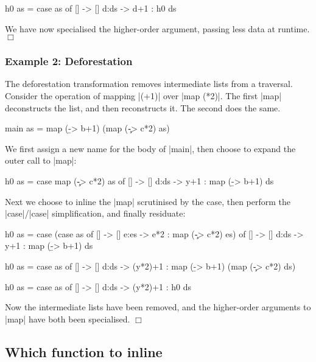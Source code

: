 \documentclass{llncs}
\newcommand{\noexample}{\hfill$\Box$}
\begin{document}
\begin{code}
h0 as = case  as of
              []    -> []
              d:ds  -> d+1 : h0 ds
\end{code}

We have now specialised the higher-order argument, passing less data at runtime.\noexample

\subsubsection{Example 2: Deforestation}\hfill

The deforestation transformation \cite{wadler:deforestation} removes intermediate lists from a traversal. Consider the operation of mapping |(+1)| over |map (*2)|. The first |map| deconstructs the list, and then reconstructs it. The second does the same.

\begin{code}
main as = map (\b -> b+1) (map (\c -> c*2) as)
\end{code}

We first assign a new name for the body of |main|, then choose to expand the outer call to |map|:

\begin{code}
h0 as = case  map (\c -> c*2) as of
              []    -> []
              d:ds  -> y+1 : map (\b -> b+1) ds
\end{code}

Next we choose to inline the |map| scrutinised by the case, then perform the |case|/|case| simplification, and finally residuate:

\begin{code}
h0 as = case  (case  as of
                     []    -> []
                     e:es  -> e*2 : map (\c -> c*2) es) of
              []    -> []
              d:ds  -> y+1 : map (\b -> b+1) ds

h0 as = case  as of
              []    -> []
              d:ds  -> (y*2)+1 : map (\b -> b+1) (map (\c -> c*2) ds)

h0 as = case  as of
              []    -> []
              d:ds  -> (y*2)+1 : h0 ds
\end{code}

Now the intermediate lists have been removed, and the higher-order arguments to |map| have both been specialised.  \noexample

\subsection{Which function to inline}
\end{document}
